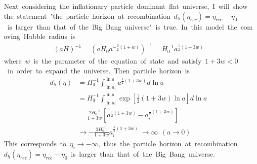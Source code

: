 Next\ considering\ the\ inflationary\ particle\ dominant\ flat\ universe,\ I\ will\ show\ the\ statement\ "the\ particle\ horizon\ at\ recombination\ $d_h(\eta_{rec})=\eta_{rec}-\eta_0$\ is\ larger\ than\ that\ of\ the\ Big\ Bang\ universe"\ is\ true.\ In\ this\ model\ the\ comoving\ Hubble\ radius\ is
\begin{align*}
    (aH)^{-1}=\left(aH_0a^{-\frac{3}{2}(1+w)}\right)^{-1}=H_0^{-1}a^{\frac{1}{2}(1+3w)}
\end{align*}
where\ $w$\ is\ the\ parameter\ of\ the\ equation\ of\ state\ and\ satisfy\ $1+3w<0$\ in\ order\ to\ expand\ the\ universe.\ Then\ particle\ horizon\ is
\begin{align}
    d_h(\eta)&=H_0^{-1}\int^{\ln{a}}_{\ln{a_i}}a^{\frac{1}{2}(1+3w)}d\ln{a}\nonumber\\
    &=H_0^{-1}\int^{\ln{a}}_{\ln{a_i}}\exp\left[\frac{1}{2}(1+3w)\ln{a}\right]d\ln{a}\nonumber\\
    &=\frac{2H_0^{-1}}{1+3w}\left[a^{\frac{1}{2}(1+3w)}-a_i^{\frac{1}{2}(1+3w)}\right]\nonumber\\
    &\to-\frac{2H_0^{-1}}{1+3w}a_i^{\frac{1}{2}(1+3w)}\ \to\infty\ \ (a\to0)
\end{align}
This\ corresponds\ to\ $\eta_i\to-\infty$,\ thus\ the\ particle\ horizon\ at\ recombination\ $d_h(\eta_{rec})=\eta_{rec}-\eta_0$\ is\ larger\ than\ that\ of\ the\ Big\ Bang\ universe.